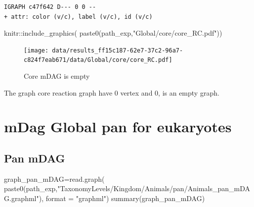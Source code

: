 \documentclass[
  letterpaper,
  DIV=11,
  numbers=noendperiod]{scrreprt}
\newenvironment{Shaded}{\begin{snugshade}}{\end{snugshade}}
\newcommand{\AttributeTok}[1]{\textcolor[rgb]{0.40,0.45,0.13}{#1}}
\newcommand{\FunctionTok}[1]{\textcolor[rgb]{0.28,0.35,0.67}{#1}}
\newcommand{\NormalTok}[1]{\textcolor[rgb]{0.00,0.23,0.31}{#1}}
\newcommand{\OtherTok}[1]{\textcolor[rgb]{0.00,0.23,0.31}{#1}}
\newcommand{\SpecialCharTok}[1]{\textcolor[rgb]{0.37,0.37,0.37}{#1}}
\newcommand{\StringTok}[1]{\textcolor[rgb]{0.13,0.47,0.30}{#1}}
\begin{document}
\begin{verbatim}
IGRAPH c47f642 D--- 0 0 -- 
+ attr: color (v/c), label (v/c), id (v/c)
\end{verbatim}

\begin{Shaded}
\begin{Highlighting}[]
\NormalTok{knitr}\SpecialCharTok{::}\FunctionTok{include\_graphics}\NormalTok{(}
  \FunctionTok{paste0}\NormalTok{(path\_exp,}\StringTok{"Global/core/core\_RC.pdf"}\NormalTok{))}
\end{Highlighting}
\end{Shaded}

\begin{figure}[H]

{\centering \texttt{[image: data/results\_ff15c187-62e7-37c2-96a7-c824f7eab671/data/Global/core/core\_RC.pdf]}

}

\caption{Core mDAG is empty}

\end{figure}

The graph core reaction graph have 0 vertex and 0, is an empty graph.

\hypertarget{mdag-global-pan-for-eukaryotes}{%
\section*{mDag Global pan for
eukaryotes}\label{mdag-global-pan-for-eukaryotes}}


\hypertarget{pan-mdag}{%
\subsection*{Pan mDAG}\label{pan-mdag}}

\begin{Shaded}
\begin{Highlighting}[]
\NormalTok{graph\_pan\_mDAG}\OtherTok{=}\FunctionTok{read.graph}\NormalTok{(}
  \FunctionTok{paste0}\NormalTok{(path\_exp,}\StringTok{"TaxonomyLevels/Kingdom/Animals/pan/Animals\_pan\_mDAG.graphml"}\NormalTok{), }\AttributeTok{format =} \StringTok{"graphml"}\NormalTok{)}
\FunctionTok{summary}\NormalTok{(graph\_pan\_mDAG)}
\end{Highlighting}
\end{Shaded}
\end{document}
